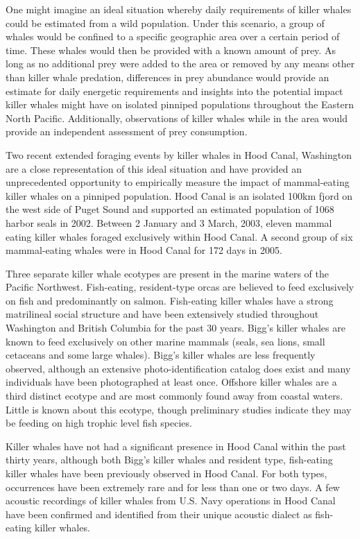 One might imagine an ideal situation whereby daily requirements of
killer whales could be estimated from a wild population. Under this
scenario, a group of whales would be confined to a specific geographic
area over a certain period of time. These whales would then be provided
with a known amount of prey. As long as no additional prey were added to
the area or removed by any means other than killer whale predation,
differences in prey abundance would provide an estimate for daily
energetic requirements and insights into the potential impact killer
whales might have on isolated pinniped populations throughout the
Eastern North Pacific. Additionally, observations of killer whales while
in the area would provide an independent assessment of prey consumption.

Two recent extended foraging events by killer whales in Hood Canal,
Washington are a close representation of this ideal situation and have
provided an unprecedented opportunity to empirically measure the impact
of mammal-eating killer whales on a pinniped population. Hood Canal is
an isolated 100km fjord on the west side of Puget Sound and supported an
estimated population of 1068 harbor seals in 2002. Between 2 January and
3 March, 2003, eleven mammal eating killer whales foraged exclusively
within Hood Canal. A second group of six mammal-eating whales were in
Hood Canal for 172 days in 2005.

Three separate killer whale ecotypes are present in the marine waters of
the Pacific Northwest. Fish-eating, resident-type orcas are believed to
feed exclusively on fish and predominantly on salmon. Fish-eating killer
whales have a strong matrilineal social structure and have been
extensively studied throughout Washington and British Columbia for the
past 30 years. Bigg's killer whales are known to feed exclusively on
other marine mammals (seals, sea lions, small cetaceans and some large
whales). Bigg's killer whales are less frequently observed, although an
extensive photo-identification catalog does exist and many individuals
have been photographed at least once. Offshore killer whales are a third
distinct ecotype and are most commonly found away from coastal waters.
Little is known about this ecotype, though preliminary studies indicate
they may be feeding on high trophic level fish species.

Killer whales have not had a significant presence in Hood Canal within
the past thirty years, although both Bigg's killer whales and resident
type, fish-eating killer whales have been previously observed in Hood
Canal. For both types, occurrences have been extremely rare and for less
than one or two days. A few acoustic recordings of killer whales from
U.S. Navy operations in Hood Canal have been confirmed and identified
from their unique acoustic dialect as fish-eating killer whales.

